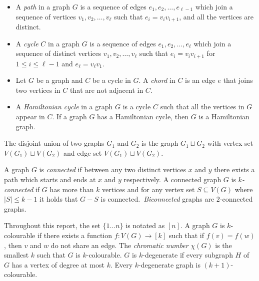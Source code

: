 \begin{itemize}
	\item A \textit{path} in a graph \(G\) is a sequence of edges \(e_1, e_2, \ldots, e_{\ell- 1}\) which join a sequence of vertices \(v_1, v_2, \ldots, v_{\ell}\) such that \(e_i = v_i v_{i + 1}\), and all the vertices are distinct.
	\item A \textit{cycle} \(C\) in a graph \(G\) is a sequence of edges \(e_1, e_2, \ldots, e_{\ell}\) which join a sequence of distinct vertices \(v_1, v_2, \ldots, v_{\ell}\) such that \(e_i = v_i v_{i + 1}\) for \(1 \leq i \leq \ell - 1\) and \(e_\ell = v_\ell v_1\).
	\item Let $G$ be a graph and $C$ be a cycle in $G$. A \textit{chord} in $C$ is an edge $e$ that joins two vertices in $C$ that are not adjacent in $C$. 
	\item A \textit{Hamiltonian cycle} in a graph \(G\) is a cycle \(C\) such that all the vertices in \(G\) appear in \(C\). If a graph $G$ has a Hamiltonian cycle, then $G$ is a Hamiltonian graph. 
\end{itemize}

The disjoint union of two graphs $G_1$ and $G_2$ is the graph $G_1 \sqcup G_2$ with vertex set $V(G_1) \sqcup V(G_2)$ and edge set $V(G_1) \sqcup V(G_2)$. 

A graph $G$ is \textit{connected} if between any two distinct vertices $x$ and $y$ there exists a path which starts and ends at $x$ and $y$ respectively. 
A connected graph \(G\) is \textit{\(k\)-connected} if \(G\) has more than \(k\) vertices and for any vertex set $S \subseteq V(G)$ where $|S| \leq k - 1$ it holds that $G - S$ is connected.\ \textit{Biconnected} graphs are $2$-connected graphs. 

Throughout this report, the set $\lbrace 1\ldots n \rbrace$ is notated as $[n]$. 
A graph \(G\) is \(k\)-colourable if there exists a function \(f: V(G) \rightarrow [k]\) such that if $f(v) = f(w)$, then $v$ and $w$ do not share an edge. The \textit{chromatic number} \(\chi(G)\) is the smallest \(k\) such that \(G\) is \(k\)-colourable.
$G$ is $k$-degenerate if every subgraph $H$ of $G$ has a vertex of degree at most $k$. Every $k$-degenerate graph is $(k + 1)$-colourable. 

